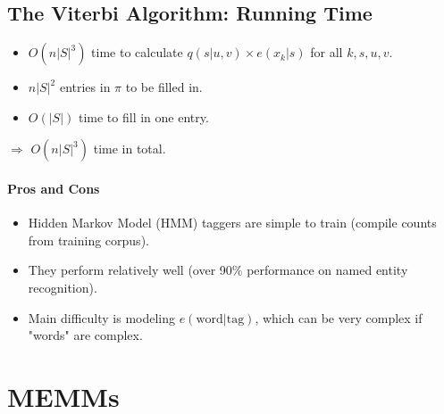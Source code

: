 \subsection{The Viterbi Algorithm: Running Time}
  \begin{itemize}
    \item $O(n|S|^3)$ time to calculate $q(s|u, v) \times e(x_k|s)$ for all $k, s, u, v$.
    \item $n|S|^2$ entries in $\pi$ to be filled in.
    \item $O(|S|)$ time to fill in one entry.
  \end{itemize}
  $\Rightarrow$ $O(n|S|^3)$ time in total.

\paragraph{Pros and Cons}
  \begin{itemize}
    \item Hidden Markov Model (HMM) taggers are simple to train (compile counts from training corpus).
    \item They perform relatively well (over 90\% performance on named entity recognition).
    \item Main difficulty is modeling $e(\text{word} | \text{tag})$, which can be very complex if "words" are complex.
  \end{itemize}
  


\section{MEMMs}  
  
